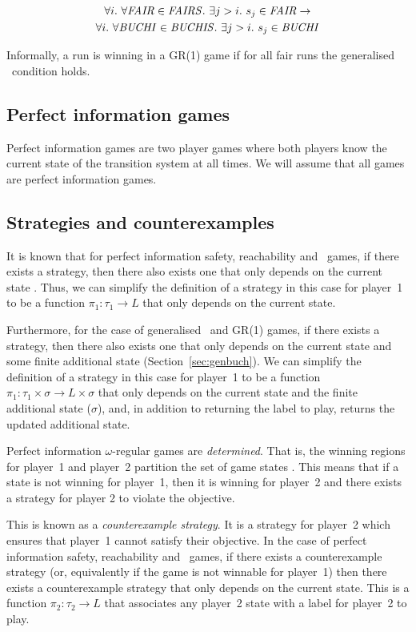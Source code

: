 \begin{multline}
\forall i.\ \forall \fairobj \in \genfairobj.\ \exists j>i.\ s_j \in \fairobj \rightarrow \\ \forall i.\ \forall \buchiobj \in \genbuchiobj.\ \exists j>i.\ s_j \in \buchiobj
\end{multline}

Informally, a run is winning in a GR(1) game if for all fair runs the generalised \buchi\ condition holds.

\subsection{Perfect information games}

Perfect information games are two player games where both players know the current state of the transition system at all times. We will assume that all games are perfect information games.

\subsection{Strategies and counterexamples}
\label{sec:strat_and_cex}

It is known that for perfect information safety, reachability and \buchi\ games, if there exists a strategy, then there also exists one that only depends on the current state \cite{Gradel}. Thus, we can simplify the definition of a strategy in this case for player~1 to be a function $\pi_1 : \tau_1 \rightarrow L$ that only depends on the current state.

Furthermore, for the case of generalised \buchi\ and GR(1) games, if there exists a strategy, then there also exists one that only depends on the current state and some finite additional state (Section~\ref{sec:genbuch}). We can simplify the definition of a strategy in this case for player~1 to be a function $\pi_1 : \tau_1 \times \sigma \rightarrow L \times \sigma$ that only depends on the current state and the finite additional state ($\sigma$), and, in addition to returning the label to play, returns the updated additional state.

Perfect information $\omega$-regular games are \emph{determined}. That is, the winning regions for player~1 and player~2 partition the set of game states \cite{Gradel}. This means that if a state is not winning for player~1, then it is winning for player~2 and there exists a strategy for player 2 to violate the objective.

This is known as a \emph{counterexample strategy}. It is a strategy for player~2 which ensures that player~1 cannot satisfy their objective. In the case of perfect information safety, reachability and \buchi\ games, if there exists a counterexample strategy (or, equivalently if the game is not winnable for player~1) then there exists a counterexample strategy that only depends on the current state. This is a function $\pi_2 : \tau_2 \rightarrow L$ that associates any player~2 state with a label for player~2 to play. 

